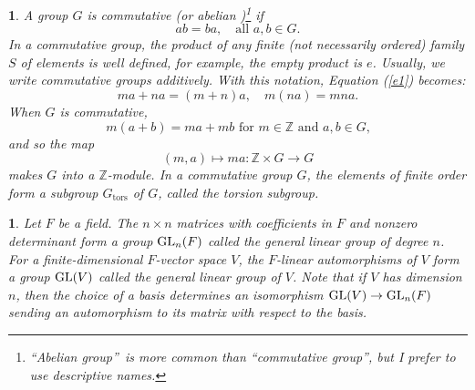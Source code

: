 \documentclass[a4paper,11pt,final,openany]{memoir}%
\newtheorem{plain}[X]{}
\theoremstyle{nonumberplain}
\begin{document}
\begin{plain}
\label{bd3d}A group $G$ is \emph{commutative}%
%
\/ (or \emph{abelian}%
%
\/)\footnote{\textquotedblleft Abelian group\textquotedblright\ is more common
than \textquotedblleft commutative group\textquotedblright, but I prefer to
use descriptive names.} if
\[
ab=ba,\quad\text{all }a,b\in G.
\]
In a commutative group, the product of any finite (not necessarily ordered)
family $S$ of elements is well defined, for example, the empty product is $e$.
Usually, we write commutative groups additively. With this notation, Equation
(\ref{e1}) becomes:%
\[
ma+na=(m+n)a,\quad m(na)=mna.
\]
When $G$ is commutative,
\[
m(a+b)=ma+mb\text{ for }m\in\mathbb{Z}{}\text{ and }a,b\in G\text{,}%
\]
and so the map%
\[
(m,a)\mapsto ma\colon\mathbb{Z}{}\times G\rightarrow G
\]
makes $G$ into a $\mathbb{Z}{}$-module. In a commutative group $G$, the
elements of finite order form a subgroup $G_{\text{tors}}$ of $G$, called the
\emph{torsion subgroup}.%
%

\end{plain}

\begin{plain}
\label{bd3e}Let $F$ be a field. The $n\times n$ matrices with coefficients in
$F$ and nonzero determinant form a group%
$\operatorname{GL}_{n}(F)$ called the \emph{general linear group of degree} $n$.%
For a finite-dimensional $F$-vector space $V$, the $F$-linear automorphisms of
$V$ form a group $\operatorname{GL}(V)$ called the \emph{general linear group of} $V$. Note
that if $V$ has dimension $n$, then the choice of a basis determines an
isomorphism $\operatorname{GL}(V)\rightarrow\operatorname{GL}_{n}(F)$ sending an automorphism to its
matrix with respect to the basis.
\end{plain}
\end{document}
